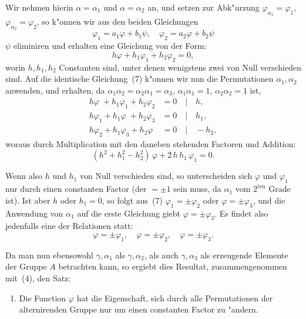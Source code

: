 \documentclass[12pt,a4paper]{article}
\theoremstyle{plain}
\begin{document}
Wir nehmen hierin $\alpha=\alpha_1$ und $\alpha=\alpha_2$ an, und setzen zur Abk"urzung $\varphi_{\alpha_1}=\varphi_1$, $\varphi_{\alpha_2}=\varphi_2$, so k"onnen wir aus den beiden Gleichungen
\[\varphi_1 = a_1\varphi + b_1\psi, \quad \varphi_2 = a_2\varphi + b_2\psi\]
$\psi$ eliminiren und erhalten eine Gleichung von der Form:
\begin{equation}\tag{7}
h\varphi + h_1\varphi_1 + h_2\varphi_2 = 0,
\end{equation}
worin $h, h_1, h_2$ Constanten sind, unter denen wenigstens zwei von Null verschieden sind. Auf die identische Gleichung~(7) k"onnen wir nun die Permutationen $\alpha_1, \alpha_2$ anwenden, und erhalten, da $\alpha_1\alpha_2 = \alpha_2\alpha_1 = \alpha_3$, $\alpha_1\alpha_1 = 1$, $\alpha_2\alpha_2 = 1$ ist,
\begin{align*}
h\varphi \;+ h_1\varphi_1 + h_2\varphi_2 &= 0 \quad\big|\quad h,\\
h\varphi_1 + h_1\varphi \;+ h_2\varphi_3 &= 0 \quad\big|\quad h_1,\\
h\varphi_2 + h_1\varphi_3 + h_2\varphi \;&= 0 \quad\big|\quad -h_2,
\end{align*}
woraus durch Multiplication mit den daneben stehenden Factoren und Addition:
\begin{equation}\tag{8}
(h^2 + h_1^2 - h_2^2)\,\varphi + 2\,h\,h_1\,\varphi_1 = 0.
\end{equation}

Wenn also $h$ und $h_1$ von Null verschieden sind, so unterscheiden sich $\varphi$ und $\varphi_1$ nur durch einen constanten Factor (der $=\pm 1$ sein muss, da $\alpha_1$ vom $2^{\text{ten}}$ Grade ist). Ist aber $h$ oder $h_1=0$, so folgt aus~(7) $\varphi_1 = \pm\varphi_2$ oder $\varphi = \pm\varphi_3$, und die Anwendung von $\alpha_1$ auf die erste Gleichung giebt $\varphi = \pm\varphi_3$. Es findet also jedenfalls eine der Relationen statt:
\begin{equation}\tag{9}
\varphi = \pm\varphi_1, \quad \varphi = \pm\varphi_2, \quad \varphi = \pm\varphi_3.
\end{equation}

Da man nun ebensowohl $\gamma, \alpha_1$ als $\gamma, \alpha_2$, als auch $\gamma, \alpha_3$ als erzeugende Elemente der Gruppe $A$ betrachten kann, so ergiebt dies Resultat, zusammengenommen mit~(4), den Satz:

\begin{enumerate}[label=\arabic*.]
\item Die Function $\varphi$ hat die Eigenschaft, sich durch alle Permutationen der alternirenden Gruppe nur um einen constanten Factor zu "andern.
\end{enumerate}
\end{document}
